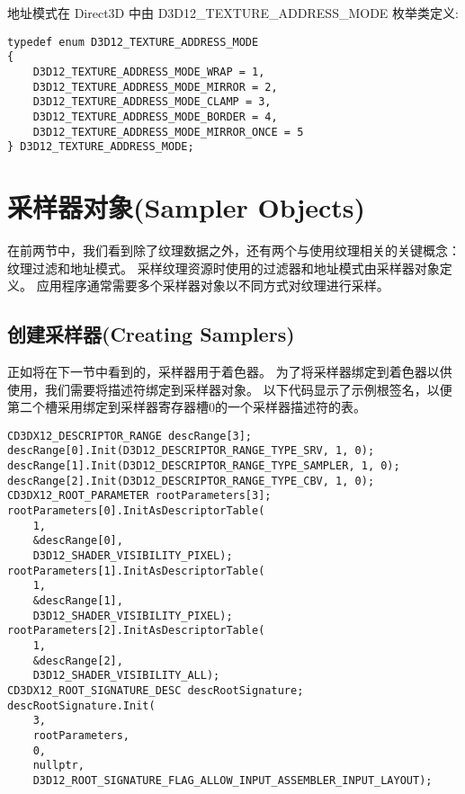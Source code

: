 \clearpage

\begin{flushleft}
地址模式在 Direct3D 中由 D3D12\_TEXTURE\_ADDRESS\_MODE 枚举类定义:\\
\end{flushleft}

\begin{lstlisting}
typedef enum D3D12_TEXTURE_ADDRESS_MODE
{
    D3D12_TEXTURE_ADDRESS_MODE_WRAP = 1,
    D3D12_TEXTURE_ADDRESS_MODE_MIRROR = 2,
    D3D12_TEXTURE_ADDRESS_MODE_CLAMP = 3,
    D3D12_TEXTURE_ADDRESS_MODE_BORDER = 4,
    D3D12_TEXTURE_ADDRESS_MODE_MIRROR_ONCE = 5
} D3D12_TEXTURE_ADDRESS_MODE;
\end{lstlisting}

\section{采样器对象(Sampler Objects)}
\begin{flushleft}
在前两节中，我们看到除了纹理数据之外，还有两个与使用纹理相关的关键概念：纹理过滤和地址模式。 采样纹理资源时使用的过滤器和地址模式由采样器对象定义。 应用程序通常需要多个采样器对象以不同方式对纹理进行采样。\\
\end{flushleft}

\subsection{创建采样器(Creating Samplers)}
\begin{flushleft}
正如将在下一节中看到的，采样器用于着色器。 为了将采样器绑定到着色器以供使用，我们需要将描述符绑定到采样器对象。 以下代码显示了示例根签名，以便第二个槽采用绑定到采样器寄存器槽0的一个采样器描述符的表。\\
\end{flushleft}

\begin{lstlisting}
CD3DX12_DESCRIPTOR_RANGE descRange[3];
descRange[0].Init(D3D12_DESCRIPTOR_RANGE_TYPE_SRV, 1, 0);
descRange[1].Init(D3D12_DESCRIPTOR_RANGE_TYPE_SAMPLER, 1, 0);
descRange[2].Init(D3D12_DESCRIPTOR_RANGE_TYPE_CBV, 1, 0);
CD3DX12_ROOT_PARAMETER rootParameters[3];
rootParameters[0].InitAsDescriptorTable(
    1,
    &descRange[0], 
    D3D12_SHADER_VISIBILITY_PIXEL);
rootParameters[1].InitAsDescriptorTable(
    1,
    &descRange[1], 
    D3D12_SHADER_VISIBILITY_PIXEL);
rootParameters[2].InitAsDescriptorTable(
    1,
    &descRange[2], 
    D3D12_SHADER_VISIBILITY_ALL);
CD3DX12_ROOT_SIGNATURE_DESC descRootSignature;
descRootSignature.Init(
    3, 
    rootParameters, 
    0, 
    nullptr,
    D3D12_ROOT_SIGNATURE_FLAG_ALLOW_INPUT_ASSEMBLER_INPUT_LAYOUT);
\end{lstlisting}

